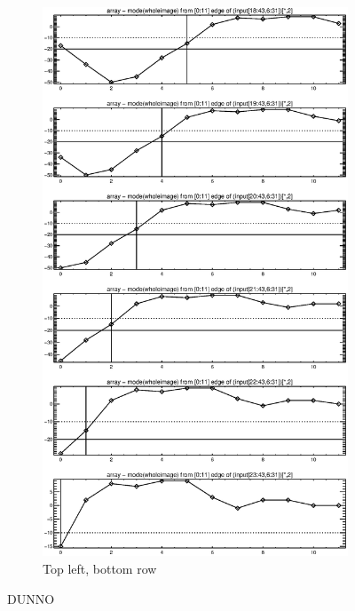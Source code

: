 \documentclass[10pt]{article}
\begin{document}
\begin{figure}[!h]
\begin{subfigure}[b]{.4\linewidth}
        \centering
        \includegraphics[width=1.4\textwidth]{plots_tables_images/topleft3.eps} 
        \caption{Top left, bottom row}
    \end{subfigure}
    \caption{DUNNO}
\end{figure}
%
%
%
%
\end{document}
